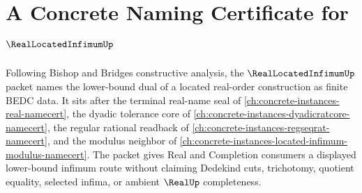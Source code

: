 \chapter{A Concrete Naming Certificate for $\RealLocatedInfimumUp$}
\label{ch:concrete-instances-real-located-infimum-namecert}

Following Bishop and Bridges constructive analysis, the $\RealLocatedInfimumUp$ packet names the lower-bound dual of a located real-order construction as finite BEDC data. It sits after the terminal real-name seal of \autoref{ch:concrete-instances-real-namecert}, the dyadic tolerance core of \autoref{ch:concrete-instances-dyadicratcore-namecert}, the regular rational readback of \autoref{ch:concrete-instances-regseqrat-namecert}, and the modulus neighbor of \autoref{ch:concrete-instances-located-infimum-modulus-namecert}. The packet gives Real and Completion consumers a displayed lower-bound infimum route without claiming Dedekind cuts, trichotomy, quotient equality, selected infima, or ambient $\RealUp$ completeness.

